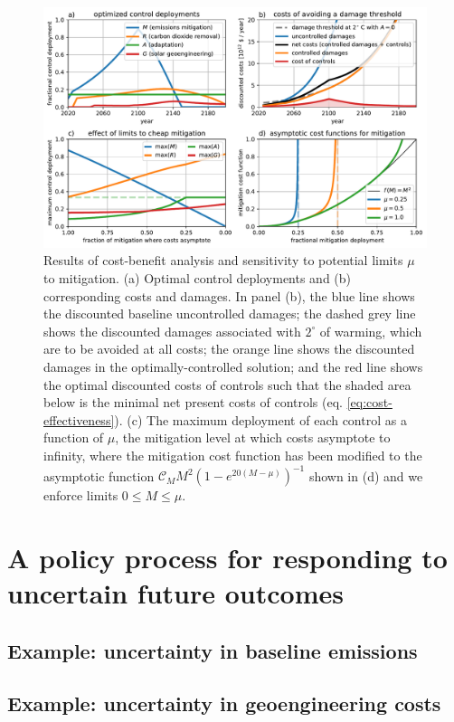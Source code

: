 \documentclass[9pt,twocolumn,twoside,lineno]{pnas-new}
\begin{document}
\begin{figure}%
\centering
\includegraphics[width=11.4cm]{figures/default-temp_controls_and_damages.pdf}
\caption{Results of cost-benefit analysis and sensitivity to potential limits $\mu$ to mitigation. (a) Optimal control deployments and (b) corresponding costs and damages. In panel (b), the blue line shows the discounted baseline uncontrolled damages; the dashed grey line shows the discounted damages associated with $2^{\circ}$ of warming, which are to be avoided at all costs; the orange line shows the discounted damages in the optimally-controlled solution; and the red line shows the optimal discounted costs of controls such that the shaded area below is the minimal net present costs of controls (eq. \ref{eq:cost-effectiveness}). (c) The maximum deployment of each control as a function of $\mu$, the mitigation level at which costs asymptote to infinity, where the mitigation cost function has been modified to the asymptotic function $\mathcal{C}_{M} M^{2} \left( 1 - e^{20 (M - \mu)} \right)^{-1}$ shown in (d) and we enforce limits $0 \leq M \leq \mu$.}
\label{fig:cost-benefit}
\end{figure}

\section*{A policy process for responding to uncertain future outcomes}

\subsection*{Example: uncertainty in baseline emissions}

\subsection*{Example: uncertainty in geoengineering costs}
\end{document}
